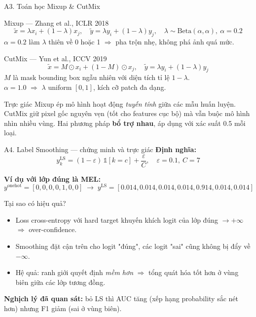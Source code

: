 \documentclass[10pt, aspectratio=169]{beamer}
\begin{document}
\begin{frame}{A3. Toán học Mixup \& CutMix}
    \footnotesize
    \begin{block}{Mixup --- Zhang et al., ICLR 2018}
        \[
            \tilde{x} = \lambda x_i + (1-\lambda) x_j, \quad
            \tilde{y} = \lambda y_i + (1-\lambda) y_j, \quad
            \lambda \sim \mathrm{Beta}(\alpha, \alpha),\ \alpha=0.2
        \]
        $\alpha=0.2$ làm $\lambda$ thiên về 0 hoặc 1 $\Rightarrow$ pha trộn nhẹ, không phá ảnh quá mức.
    \end{block}

    \begin{block}{CutMix --- Yun et al., ICCV 2019}
        \[
            \tilde{x} = M \odot x_i + (1-M) \odot x_j, \quad
            \tilde{y} = \lambda y_i + (1-\lambda) y_j
        \]
        $M$ là mask bounding box ngẫu nhiên với diện tích tỉ lệ $1-\lambda$.\\
        $\alpha=1.0$ $\Rightarrow$ $\lambda$ uniform $[0,1]$, kích cỡ patch đa dạng.
    \end{block}

    \begin{block}{Trực giác}
        Mixup ép mô hình hoạt động \textit{tuyến tính} giữa các mẫu huấn luyện. CutMix giữ pixel gốc nguyên vẹn (tốt cho features cục bộ) mà vẫn buộc mô hình nhìn nhiều vùng. Hai phương pháp \textbf{bổ trợ nhau}, áp dụng với xác suất 0.5 mỗi loại.
    \end{block}
\end{frame}

\begin{frame}{A4. Label Smoothing --- chứng minh và trực giác}
    \footnotesize
    \textbf{Định nghĩa:}
    \[
        y^{\text{LS}}_k = (1 - \varepsilon)\, \mathbb{1}[k = c] + \frac{\varepsilon}{C}, \quad \varepsilon = 0.1,\ C=7
    \]

    \textbf{Ví dụ với lớp đúng là MEL:}
    \[
        y^{\text{onehot}} = [0,0,0,0,1,0,0] \;\rightarrow\; y^{\text{LS}} = [0.014, 0.014, 0.014, 0.014, 0.914, 0.014, 0.014]
    \]

    \begin{block}{Tại sao có hiệu quả?}
        \begin{itemize}
            \item Loss cross-entropy với hard target khuyến khích logit của lớp đúng $\rightarrow +\infty$ $\Rightarrow$ over-confidence.
            \item Smoothing đặt cận trên cho logit "đúng", các logit "sai" cũng không bị đẩy về $-\infty$.
            \item Hệ quả: ranh giới quyết định \textit{mềm hơn} $\Rightarrow$ tổng quát hóa tốt hơn ở vùng biên giữa các lớp tương đồng.
        \end{itemize}
    \end{block}

    \textbf{Nghịch lý đã quan sát:} bỏ LS thì AUC tăng (xếp hạng probability sắc nét hơn) nhưng F1 giảm (sai ở vùng biên).
\end{frame}
\end{document}
